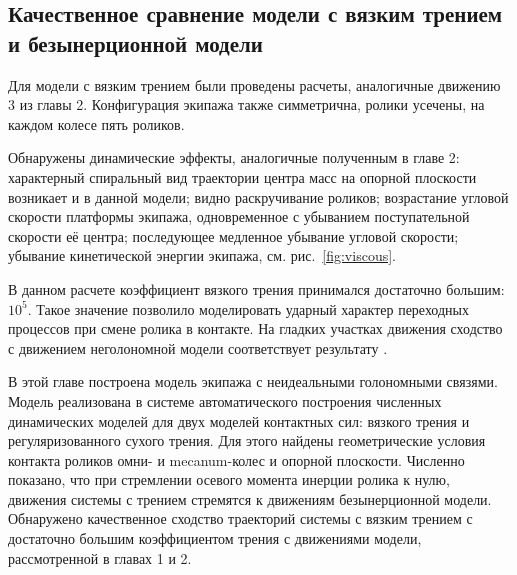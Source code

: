 \subsection{Качественное сравнение модели с вязким трением и безынерционной модели}

Для модели с вязким трением были проведены расчеты, аналогичные движению 3 из главы 2. Конфигурация экипажа также симметрична, ролики усечены, на каждом колесе пять роликов.

Обнаружены динамические эффекты, аналогичные полученным в главе 2: характерный спиральный вид траектории центра масс на опорной плоскости возникает и в данной модели; видно раскручивание роликов; возрастание угловой скорости платформы экипажа, одновременное с убыванием поступательной скорости её центра; последующее медленное убывание угловой скорости; убывание кинетической энергии экипажа, см. рис.~\ref{fig:viscous}.

В данном расчете коэффициент вязкого трения принимался достаточно большим: $10^{5}$. Такое значение позволило моделировать ударный характер переходных процессов при смене ролика в контакте. На гладких участках движения сходство с движением неголономной модели соответствует результату \cite{karapetyan1981negolonom}.

В этой главе построена модель экипажа с неидеальными голономными связями. Модель реализована в системе автоматического построения численных динамических моделей для двух моделей контактных сил: вязкого трения и регуляризованного сухого трения. Для этого найдены геометрические условия контакта роликов омни- и mecanum-колес и опорной плоскости. Численно показано, что при стремлении осевого момента инерции ролика к нулю, движения системы с трением стремятся к движениям безынерционной модели. Обнаружено качественное сходство траекторий системы с вязким трением с достаточно большим коэффициентом трения с движениями модели, рассмотренной в главах 1 и 2.

